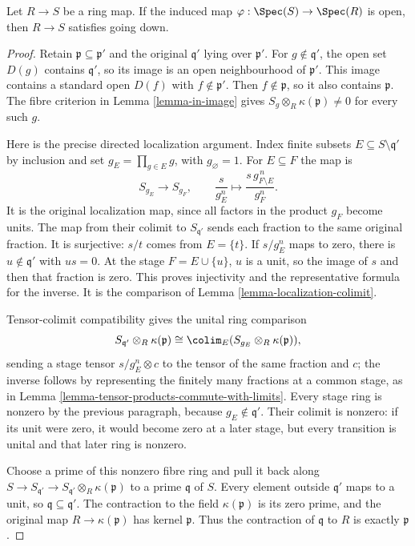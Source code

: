 \begin{lemma}
\label{lemma-open-going-down}
Let $R \to S$ be a ring map. If the induced map
$\varphi : \Spec(S) \to \Spec(R)$ is open, then
$R \to S$ satisfies going down.
\end{lemma}

\begin{proof}
Retain $\mathfrak p\subseteq\mathfrak p'$ and the original
$\mathfrak q'$ lying over $\mathfrak p'$.
For $g\notin\mathfrak q'$, the open set $D(g)$ contains
$\mathfrak q'$, so its image is an open neighbourhood of
$\mathfrak p'$. This image contains a standard open
$D(f)$ with $f\notin\mathfrak p'$. Then
$f\notin\mathfrak p$, so it also contains $\mathfrak p$.
The fibre criterion in Lemma \ref{lemma-in-image} gives
$S_g\otimes_R\kappa(\mathfrak p)\ne0$ for every such $g$.

Here is the precise directed localization argument. Index
finite subsets $E\subseteq S\setminus\mathfrak q'$ by
inclusion and set $g_E=\prod_{g\in E}g$, with $g_\varnothing=1$.
For $E\subseteq F$ the map is
$$
S_{g_E}\longrightarrow S_{g_F},\qquad
\frac{s}{g_E^n}\longmapsto
\frac{s\,g_{F\setminus E}^{\,n}}{g_F^n}.
$$
It is the original localization map, since all factors
in the product $g_F$ become units. The map from their
colimit to $S_{\mathfrak q'}$ sends each fraction to the
same original fraction. It is surjective: $s/t$ comes
from $E=\{t\}$. If $s/g_E^n$ maps to zero, there is
$u\notin\mathfrak q'$ with $us=0$. At the stage
$F=E\cup\{u\}$, $u$ is a unit, so the image of $s$
and then that fraction is zero. This proves injectivity
and the representative formula for the inverse. It is
the comparison of Lemma \ref{lemma-localization-colimit}.

Tensor-colimit compatibility gives the unital ring
comparison
$$
S_{\mathfrak q'}\otimes_R\kappa(\mathfrak p)
\cong\colim_E(S_{g_E}\otimes_R\kappa(\mathfrak p)),
$$
sending a stage tensor $s/g_E^n\otimes c$ to the tensor
of the same fraction and $c$; the inverse follows by
representing the finitely many fractions at a common
stage, as in Lemma \ref{lemma-tensor-products-commute-with-limits}.
Every stage ring is nonzero by the previous paragraph,
because $g_E\notin\mathfrak q'$. Their colimit is nonzero:
if its unit were zero, it would become zero at a later
stage, but every transition is unital and that later
ring is nonzero.

Choose a prime of this nonzero fibre ring and pull it
back along $S\to S_{\mathfrak q'}\to
S_{\mathfrak q'}\otimes_R\kappa(\mathfrak p)$ to a prime
$\mathfrak q$ of $S$. Every element outside
$\mathfrak q'$ maps to a unit, so
$\mathfrak q\subseteq\mathfrak q'$.
The contraction to the field $\kappa(\mathfrak p)$ is
its zero prime, and the original map $R\to\kappa(\mathfrak p)$
has kernel $\mathfrak p$. Thus the contraction of
$\mathfrak q$ to $R$ is exactly $\mathfrak p$.


\end{proof}
